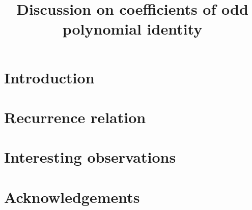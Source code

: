 \documentclass[10pt,letterpaper,oneside,reqno]{amsart}
\title[Discussion on coefficients of odd polynomial identity]
{Discussion on coefficients of odd polynomial identity}
\begin{document}
%        

    \maketitle


    \section{Introduction}\label{sec:introduction}
    


    \section{Recurrence relation}\label{sec:recurrence-relation}
    


%    

    \section{Interesting observations}\label{sec:interesting-observations}
    

    \section{Acknowledgements}\label{sec:acknowledgements}
    

    
    
\end{document}
